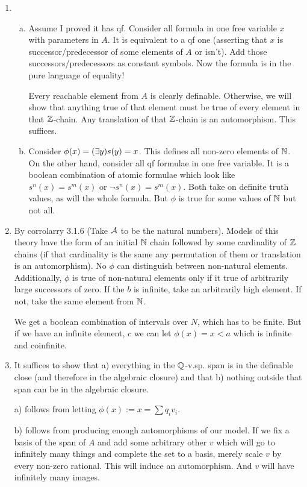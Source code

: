 \begin{enumerate}[1.]
\item
 
  \begin{enumerate}[a)] 
  \item Assume I proved it has qf. Consider all formula in one free variable \(x\) with parameters in \(A\). It is equivalent to a qf one (asserting that \(x\) is successor/predecessor of some elements of \(A\) or isn't). Add those successors/predecessors as constant symbols. Now the formula is in the pure language of equality! 

Every reachable element from \(A\) is clearly definable. Otherwise, we will show that anything true of that element must be true of every element in that \(\mathbb{Z}\)-chain. Any translation of that \(\mathbb{Z}\)-chain is an automorphism. This suffices. 
 
  \item Consider \(\phi(x) = (\exists y) s(y) = x\). This defines all non-zero elements of \(\mathbb{N}\). On the other hand, consider all qf formulae in one free variable. It is a boolean combination of atomic formulae which look like \(s^n(x) = s^m(x)\) or \(\neg s^n(x) = s^m(x)\). Both take on definite truth values, as will the whole formula. But \(\phi\) is true for some values of \(\mathbb{N}\) but not all. 

  \end{enumerate}

\item By corrolarry 3.1.6 (Take \(\mathcal{A}\) to be the natural numbers). Models of this theory have the form of an initial \(\mathbb{N}\) chain followed by some cardinality of \(\mathbb{Z}\) chains (if that cardinality is the same any permutation of them or translation is an automorphism). No \(\phi\) can distinguish between non-natural elements. Additionally, \(\phi\) is true of non-natural elements only if it true of arbitrarily large successors of zero. If the \(b\) is infinite, take an arbitrarily high element. If not, take the same element from \(\mathbb{N}\). 

We get a boolean combination of intervals over \(N\), which has to be finite. But if we have an infinite element, \(c\) we can let \(\phi(x) = x < a\) which is infinite and coinfinite. 

\item It suffices to show that a) everything in the \(\mathbb{Q}\)-v.sp. span is in the definable close (and therefore in the algebraic closure) and that b) nothing outside that span can be in the algebraic closure. 

a) follows from letting \(\phi(x) := x = \sum q_i v_i\).

b) follows from producing enough automorphisms of our model. If we fix a basis of the span of \(A\) and add some arbitrary other \(v\) which will go to infinitely many things and complete the set to a basis, merely scale \(v\) by every non-zero rational. This will induce an automorphism. And \(v\) will have infinitely many images. 

\end{enumerate}
